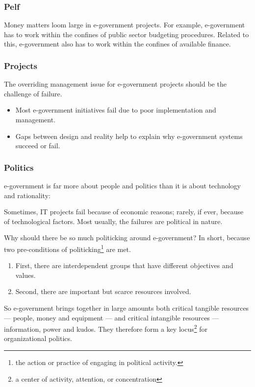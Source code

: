 \subsubsection{Pelf}
Money matters loom large in e-government projects. For example, e-government has to work within the confines of public sector budgeting procedures. Related to this, e-government also has to work within the confines of available finance.

 \subsubsection{Projects}
The overriding management issue for e-government projects should be the challenge of failure. 
\begin{itemize}
	\item Most e-government initiatives fail due to poor implementation and management.
	\item Gaps between design and reality help to explain why e-government systems succeed or fail.
\end{itemize}


\subsubsection{Politics}
e-government is far more about people and politics than it is about technology and rationality:

Sometimes, IT projects fail because of economic reasons; rarely, if ever, because of technological factors. Most usually, the failures are political in nature.

Why should there be so much politicking around e-government? In short, because two pre-conditions of politicking\footnote{the action or practice of engaging in political activity.} are met.

\begin{enumerate}
	\item First, there are interdependent groups that have different objectives and values. 
	\item Second, there are important but scarce resources involved.
\end{enumerate}

So e-government brings together in large amounts both critical tangible resources — people, money and equipment — and critical intangible resources — information, power and kudos. They therefore form a key locus\footnote{a center of activity, attention, or concentration} for organizational politics.


